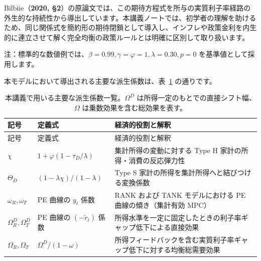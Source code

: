 \documentclass[
  japanese,
  lualatex,
  ja=standard,
  12pt,
  a4paper]{ltjsarticle}
\begin{document}
Bilbiie（\textbf{2020,
§2}）の原論文では、この期待方程式を所与の実質利子率経路の外生的な持続性から導出しています。本講義ノートでは、初学者の理解を助けるため、同じ関係式を簡約形の期待閉鎖として導入し、インフレや政策金利を内生的に連立させて解く完全均衡の政策ルールとは明確に区別して取り扱います。

注：標準的な数値例では、\(\beta=0.99, \gamma=\varphi=1, \lambda=0.30, p=0\)
を基準値として採用します。

本モデルにおいて導出される主要な派生係数は、表~\ref{tbl-lecture12-derived-coefficients}
の通りです。

\begin{longtable}[]{@{}
  >{\raggedright\arraybackslash}p{}
  >{\raggedright\arraybackslash}p{}
  >{\raggedright\arraybackslash}p{}@{}}
\caption{本講義で用いる主要な派生係数一覧。\(\Omega^D\)
は所得一定のもとでの直接シフト幅、\(\Omega\)
は乗数効果を含む総効果を表す。}\label{tbl-lecture12-derived-coefficients}\tabularnewline
\toprule\noalign{}
\begin{minipage}[b]{\linewidth}\raggedright
記号
\end{minipage} & \begin{minipage}[b]{\linewidth}\raggedright
定義式
\end{minipage} & \begin{minipage}[b]{\linewidth}\raggedright
経済的役割と解釈
\end{minipage} \\
\midrule\noalign{}
\endfirsthead
\toprule\noalign{}
\begin{minipage}[b]{\linewidth}\raggedright
記号
\end{minipage} & \begin{minipage}[b]{\linewidth}\raggedright
定義式
\end{minipage} & \begin{minipage}[b]{\linewidth}\raggedright
経済的役割と解釈
\end{minipage} \\
\midrule\noalign{}
\endhead
\bottomrule\noalign{}
\endlastfoot
\(\chi\) & \(1 + \varphi(1 - \tau_D/\lambda)\) & 集計所得の変動に対する
Type H 家計の所得・消費の反応弾力性 \\
\(\Theta_D\) & \((1 - \lambda\chi)/(1-\lambda)\) & Type S
家計の所得を集計所得へと結びつける変換係数 \\
\(\omega_R, \omega_T\) & PE 曲線の \(y_t\) 係数 & RANK および TANK
モデルにおける PE 曲線の傾き（集計有効 MPC） \\
\(\Omega_R^D, \Omega_T^D\) & PE 曲線の \((-\widetilde{r}_t)\) 係数 &
所得水準を一定に固定したときの利子率ギャップ低下による直接効果 \\
\(\Omega_R, \Omega_T\) & \(\Omega^D / (1-\omega)\) &
所得フィードバックを含む実質利子率ギャップ低下に対する均衡総需要効果 \\
\end{longtable}
\end{document}
